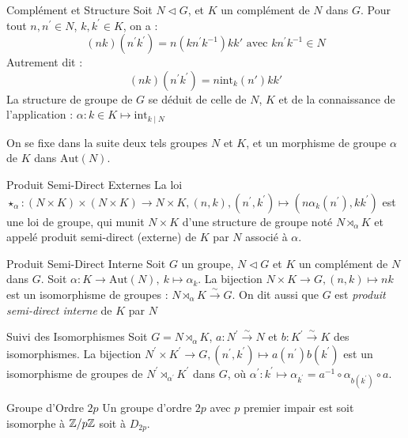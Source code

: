 \documentclass{cours}
\begin{document}
\begin{remarque}{Complément et Structure}{}
    Soit $N \lhd G$, et $K$ un complément de $N$ dans $G$. Pour tout $n, n^{'} \in N$, $k, k^{'} \in K$, on a :
    \[
        (nk)(n^{'}k^{'}) = n(kn^{'}k^{-1})kk' \text{ avec } kn^{'}k^{-1} \in N
    \]
    Autrement dit :
    \[
        (nk)(n^{'}k^{'}) = n\text{int}_{k}(n')kk'
    \]
    La structure de groupe de $G$ se déduit de celle de $N$, $K$ et de la connaissance de l'application : $\alpha : k \in K \mapsto \text{int}_{k\mid N}$
\end{remarque}

On se fixe dans la suite deux tels groupes $N$ et $K$, et un morphisme de groupe $\alpha$ de $K$ dans $\text{Aut}(N)$.

\begin{définition}{Produit Semi-Direct Externes}{}
    La loi $\star_{\alpha} : (N \times K) \times (N \times K) \rightarrow N \times K, (n, k), (n^{'}, k^{'}) \mapsto (n\alpha_{k}(n^{'}), kk^{'})$ est une loi de groupe, qui munit $N \times K$ d'une structure de groupe noté $N \rtimes_{\alpha} K$ et appelé produit semi-direct (externe) de $K$ par $N$ associé à $\alpha$.
\end{définition}

\begin{propositionfr}{Produit Semi-Direct Interne}{}
    Soit $G$ un groupe, $N \lhd G$ et $K$ un complément de $N$ dans $G$. Soit $\alpha : K \rightarrow \text{Aut}(N),\ k \mapsto \alpha_{k}$. La bijection $N \times K \rightarrow G, (n, k) \mapsto nk$ est un isomorphisme de groupes : $N \rtimes_{\alpha} K \xrightarrow{\sim} G$. On dit aussi que $G$ est \emph{produit semi-direct interne} de $K$ par $N$
\end{propositionfr}

\begin{propositionfr}{Suivi des Isomorphismes}{}
    Soit $G = N \rtimes_{\alpha} K$, $a : N^{'} \xrightarrow{\sim} N$ et $b : K^{'} \xrightarrow{\sim} K$ des isomorphismes. La bijection $N^{'}\times K^{'} \rightarrow G, (n^{'}, k^{'}) \mapsto a(n^{'})b(k^{'})$ est un isomorphisme de groupes de $N^{'} \rtimes_{\alpha^{'}} K^{'}$ dans $G$, où $\alpha^{'} : k^{'} \mapsto \alpha_{k^{'}} = a^{-1}\circ \alpha_{b(k^{'})} \circ a$.
\end{propositionfr}

\begin{propositionfr}{Groupe d'Ordre $2p$}{}
    Un groupe d'ordre $2p$ avec $p$ premier impair est soit isomorphe à $\mathbb{Z}/p\mathbb{Z}$ soit à $D_{2p}$.
\end{propositionfr}
\end{document}
